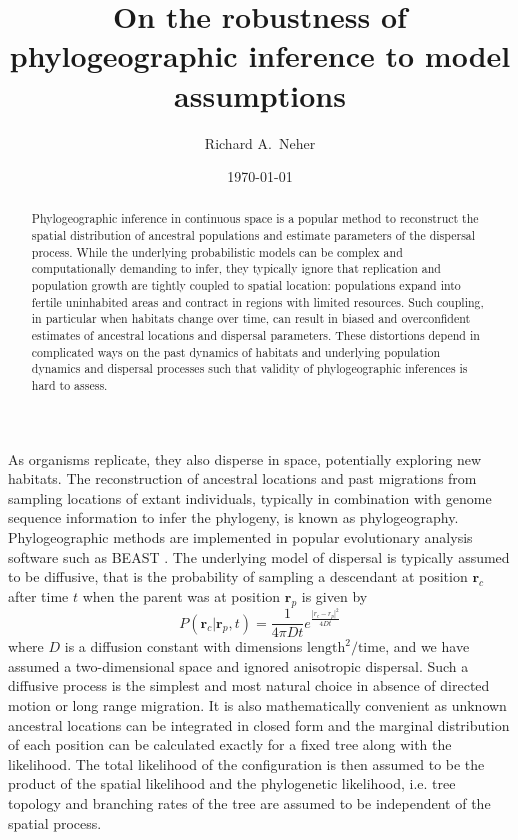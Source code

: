 \documentclass[aps,rmp, twocolumn]{revtex4}
\newcommand{\rvec}{\mathbf{r}}
\begin{document}
\title{On the robustness of phylogeographic inference to model assumptions}
\author{Richard A.~Neher}
\date{\today}
\begin{abstract}
Phylogeographic inference in continuous space is a popular method to reconstruct the spatial distribution of ancestral populations and estimate parameters of the dispersal process.
While the underlying probabilistic models can be complex and computationally demanding to infer, they typically ignore that replication and population growth are tightly coupled to spatial location: populations expand into fertile uninhabited areas and contract in regions with limited resources.
Such coupling, in particular when habitats change over time, can result in biased and overconfident estimates of ancestral locations and dispersal parameters.
These distortions depend in complicated ways on the past dynamics of habitats and underlying population dynamics and dispersal processes such that validity of phylogeographic inferences is hard to assess.
\end{abstract}

\maketitle
As organisms replicate, they also disperse in space, potentially exploring new habitats.
The reconstruction of ancestral locations and past migrations from sampling locations of extant individuals, typically in combination with genome sequence information to infer the phylogeny, is known as phylogeography.
Phylogeographic methods are implemented in popular evolutionary analysis software such as BEAST \citep{pybus_unifying_2012,lemey_phylogeography_2010}.
The underlying model of dispersal is typically assumed to be diffusive, that is the probability of sampling a descendant at position $\rvec_c$ after time $t$ when the parent was at position $\rvec_p$ is given by
\begin{equation}
    P(\rvec_c| \rvec_p, t) = \frac{1}{4\pi D t}e^{\frac{|r_c - r_p|^2}{4Dt}}
\end{equation}
where $D$ is a diffusion constant with dimensions $\mathrm{length}^2/\mathrm{time}$, and we have assumed a two-dimensional space and ignored anisotropic dispersal.
Such a diffusive process is the simplest and most natural choice in absence of directed motion or long range migration.
It is also mathematically convenient as unknown ancestral locations can be integrated in closed form and the marginal distribution of each position can be calculated exactly for a fixed tree along with the likelihood.
The total likelihood of the configuration is then assumed to be the product of the spatial likelihood and the phylogenetic likelihood, i.e. tree topology and branching rates of the tree are assumed to be independent of the spatial process.
\end{document}
